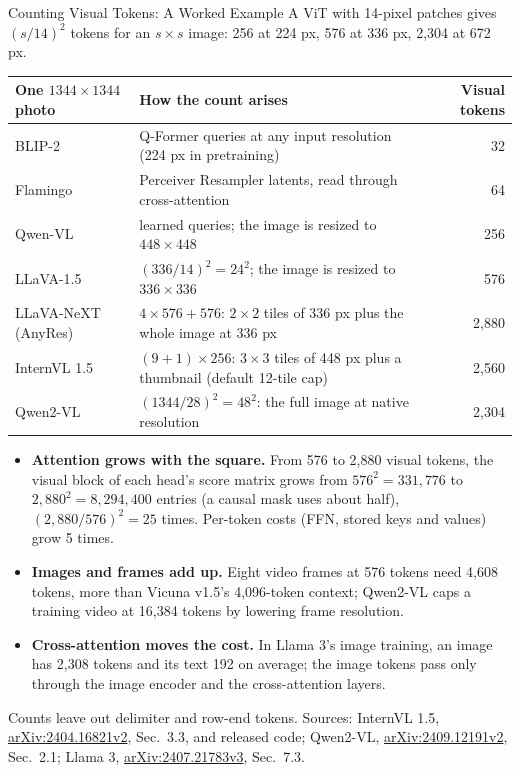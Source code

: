 \begin{frame}{Counting Visual Tokens: A Worked Example}
  \begingroup\scriptsize
  A ViT with 14-pixel patches gives $(s/14)^2$ tokens for an $s \times s$ image: 256 at 224 px, 576 at 336 px, 2,304 at 672 px.\par
  \endgroup
  \vspace{0.2em}
  \begingroup\centering
  {\scriptsize\setlength{\tabcolsep}{5pt}
  \begin{tabular}{>{\raggedright\arraybackslash}p{2.6cm} >{\raggedright\arraybackslash}p{8.2cm} r}
    \toprule
    \textbf{One $1344 \times 1344$ photo} & \textbf{How the count arises} & \textbf{Visual tokens} \\
    \midrule
    BLIP-2 & 32 Q-Former queries at any input resolution (224 px in pretraining) & 32 \\
    Flamingo & 64 Perceiver Resampler latents, read through cross-attention & 64 \\
    Qwen-VL & 256 learned queries; the image is resized to $448 \times 448$ & 256 \\
    LLaVA-1.5 & $(336/14)^2 = 24^2$; the image is resized to $336 \times 336$ & 576 \\
    LLaVA-NeXT (AnyRes) & $4 \times 576 + 576$: $2 \times 2$ tiles of 336 px plus the whole image at 336 px & 2,880 \\
    InternVL 1.5 & $(9 + 1) \times 256$: $3 \times 3$ tiles of 448 px plus a thumbnail (default 12-tile cap) & 2,560 \\
    Qwen2-VL & $(1344/28)^2 = 48^2$: the full image at native resolution & 2,304 \\
    \bottomrule
  \end{tabular}\par}
  \endgroup
  \vspace{0.15em}
  \begin{itemize}\scriptsize\itemsep0.2em
    \item \textbf{Attention grows with the square.} From 576 to 2,880 visual tokens, the visual block of each head's score matrix grows from $576^2 = 331{,}776$ to $2{,}880^2 = 8{,}294{,}400$ entries (a causal mask uses about half), $(2{,}880/576)^2 = 25$ times. Per-token costs (FFN, stored keys and values) grow 5 times.
    \item \textbf{Images and frames add up.} Eight video frames at 576 tokens need 4,608 tokens, more than Vicuna v1.5's 4,096-token context; Qwen2-VL caps a training video at 16,384 tokens by lowering frame resolution.
    \item \textbf{Cross-attention moves the cost.} In Llama 3's image training, an image has 2,308 tokens and its text 192 on average; the image tokens pass only through the image encoder and the cross-attention layers.
  \end{itemize}
  \vspace{0.1em}
  {\scriptsize Counts leave out delimiter and row-end tokens. Sources: InternVL 1.5, \href{https://arxiv.org/abs/2404.16821v2}{arXiv:2404.16821v2}, Sec.~3.3, and released code; Qwen2-VL, \href{https://arxiv.org/abs/2409.12191v2}{arXiv:2409.12191v2}, Sec.~2.1; Llama 3, \href{https://arxiv.org/abs/2407.21783v3}{arXiv:2407.21783v3}, Sec.~7.3.\par}
\end{frame}
